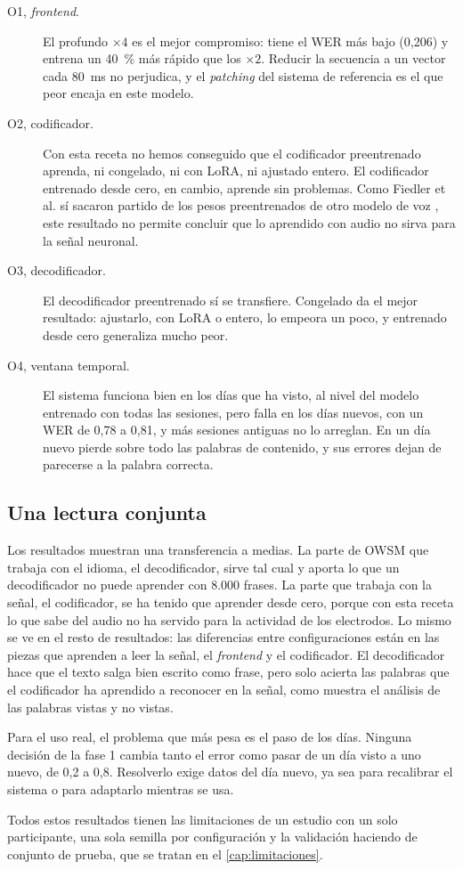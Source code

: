 \begin{description}
  \item[O1, \textit{frontend}.] El profundo $\times 4$ es el mejor compromiso: tiene el WER más bajo (0,206) y entrena un 40~\% más rápido que los $\times 2$. Reducir la secuencia a un vector cada 80~ms no perjudica, y el \textit{patching} del sistema de referencia es el que peor encaja en este modelo.
  \item[O2, codificador.] Con esta receta no hemos conseguido que el codificador preentrenado aprenda, ni congelado, ni con LoRA, ni ajustado entero. El codificador entrenado desde cero, en cambio, aprende sin problemas. Como Fiedler et al. sí sacaron partido de los pesos preentrenados de otro modelo de voz \cite{fiedler2025wav2vec2brain}, este resultado no permite concluir que lo aprendido con audio no sirva para la señal neuronal.
  \item[O3, decodificador.] El decodificador preentrenado sí se transfiere. Congelado da el mejor resultado: ajustarlo, con LoRA o entero, lo empeora un poco, y entrenado desde cero generaliza mucho peor.
  \item[O4, ventana temporal.] El sistema funciona bien en los días que ha visto, al nivel del modelo entrenado con todas las sesiones, pero falla en los días nuevos, con un WER de 0,78 a 0,81, y más sesiones antiguas no lo arreglan. En un día nuevo pierde sobre todo las palabras de contenido, y sus errores dejan de parecerse a la palabra correcta.
\end{description}

\subsection{Una lectura conjunta}

Los resultados muestran una transferencia a medias. La parte de OWSM que trabaja con el idioma, el decodificador, sirve tal cual y aporta lo que un decodificador no puede aprender con 8.000 frases. La parte que trabaja con la señal, el codificador, se ha tenido que aprender desde cero, porque con esta receta lo que sabe del audio no ha servido para la actividad de los electrodos. Lo mismo se ve en el resto de resultados: las diferencias entre configuraciones están en las piezas que aprenden a leer la señal, el \textit{frontend} y el codificador. El decodificador hace que el texto salga bien escrito como frase, pero solo acierta las palabras que el codificador ha aprendido a reconocer en la señal, como muestra el análisis de las palabras vistas y no vistas.

Para el uso real, el problema que más pesa es el paso de los días. Ninguna decisión de la fase 1 cambia tanto el error como pasar de un día visto a uno nuevo, de 0,2 a 0,8. Resolverlo exige datos del día nuevo, ya sea para recalibrar el sistema o para adaptarlo mientras se usa.

Todos estos resultados tienen las limitaciones de un estudio con un solo participante, una sola semilla por configuración y la validación haciendo de conjunto de prueba, que se tratan en el \cref{cap:limitaciones}.

